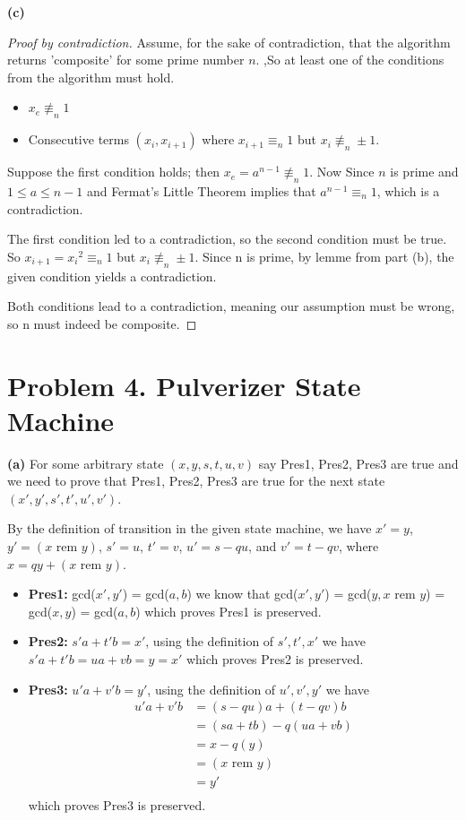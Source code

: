 \documentclass{article}
\begin{document}
\noindent\textbf{(c)}
\begin{proof}[Proof by contradiction]
Assume, for the sake of contradiction, that the algorithm returns 'composite' for some prime number $n$.
,So at least one of the conditions from the algorithm must hold.
\begin{itemize}
\item $x_e \not\equiv_n 1$
\item Consecutive terms $(x_i, x_{i+1})$ where $x_{i+1} \equiv_n 1$ but $x_i \not\equiv_n \pm 1$.
\end{itemize}

Suppose the first condition holds; then $x_e = a^{n-1} \not\equiv_n 1$.
Now Since $n$ is prime and $1 \leq a \leq n-1$ and
Fermat's Little Theorem implies that $a^{n-1} \equiv_n 1$, which is a contradiction.

The first condition led to a contradiction, so the second condition must be true.
So $x_{i+1} = {x_i}^2 \equiv_n 1$ but $x_i \not\equiv_n \pm 1$.
Since n is prime, by lemme from part (b), the given condition yields a contradiction.

Both conditions lead to a contradiction, meaning our assumption must be wrong, so n must indeed be composite.
\end{proof}

\section*{Problem 4. Pulverizer State Machine}
\textbf{(a)}
For some arbitrary state $(x, y, s, t, u, v)$ say Pres1, Pres2, Pres3 are true and we need to prove that Pres1, Pres2, Pres3 are true for the next state $(x', y', s', t', u', v')$.

By the definition of transition in the given state machine, we have $x' = y$, $y' = (x \text{ rem } y)$, $s' = u$, $t' = v$, $u' = s - qu$, and $v' = t - qv$, where $x = qy + (x \text{ rem } y)$.
\begin{itemize}

\item \textbf{Pres1:} gcd($x', y'$) = gcd($a, b$) we know that gcd($x', y'$) = gcd($y, x \text{ rem } y$) = gcd($x, y$) = gcd($a, b$) which proves Pres1 is preserved.

\item \textbf{Pres2:} $s'a + t'b = x'$, using the definition of $s', t', x'$ we have $s'a + t'b = ua + vb = y = x'$ which proves Pres2 is preserved.

\item \textbf{Pres3:} $u'a + v'b = y'$, using the definition of $u', v', y'$ we have
\[
\begin{aligned}
u'a + v'b &= (s - qu)a + (t - qv)b\\
&= (sa + tb) - q(ua + vb)\\
&= x - q(y) \\
&= (x \text{ rem } y)\\
&= y'\\
\end{aligned}
\]
which proves Pres3 is preserved.
\end{itemize}
\end{document}
